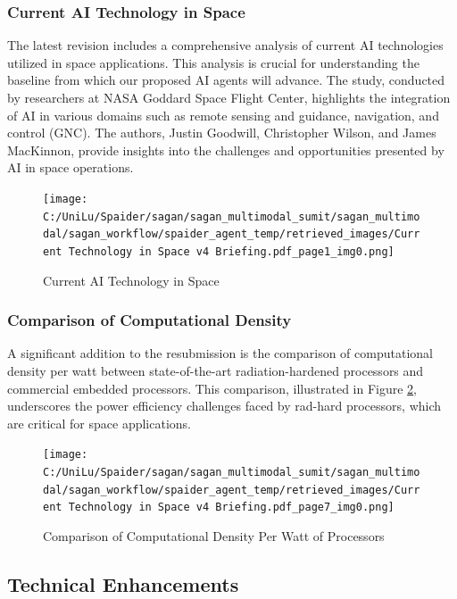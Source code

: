 \documentclass[a4paper, 11pt]{article}
\begin{document}
\subsubsection{Current AI Technology in Space}

The latest revision includes a comprehensive analysis of current AI technologies utilized in space applications. This analysis is crucial for understanding the baseline from which our proposed AI agents will advance. The study, conducted by researchers at NASA Goddard Space Flight Center, highlights the integration of AI in various domains such as remote sensing and guidance, navigation, and control (GNC). The authors, Justin Goodwill, Christopher Wilson, and James MacKinnon, provide insights into the challenges and opportunities presented by AI in space operations.

\begin{figure}[htbp]
    \centering
    \texttt{[image: C:/UniLu/Spaider/sagan/sagan\_multimodal\_sumit/sagan\_multimodal/sagan\_workflow/spaider\_agent\_temp/retrieved\_images/Current Technology in Space v4 Briefing.pdf\_page1\_img0.png]}
    \caption{Current AI Technology in Space}
    \label{fig:current-ai-tech}
\end{figure}

\subsubsection{Comparison of Computational Density}

A significant addition to the resubmission is the comparison of computational density per watt between state-of-the-art radiation-hardened processors and commercial embedded processors. This comparison, illustrated in Figure \ref{fig:comp-density}, underscores the power efficiency challenges faced by rad-hard processors, which are critical for space applications.

\begin{figure}[htbp]
    \centering
    \texttt{[image: C:/UniLu/Spaider/sagan/sagan\_multimodal\_sumit/sagan\_multimodal/sagan\_workflow/spaider\_agent\_temp/retrieved\_images/Current Technology in Space v4 Briefing.pdf\_page7\_img0.png]}
    \caption{Comparison of Computational Density Per Watt of Processors}
    \label{fig:comp-density}
\end{figure}

\subsection{Technical Enhancements}
\end{document}
